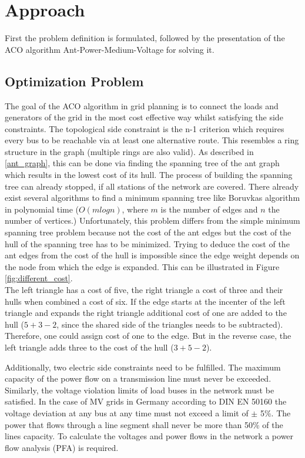 \chapter{Approach}\label{chap:approach}
First the problem definition is formulated, followed by the presentation of the ACO algorithm Ant-Power-Medium-Voltage for solving it.

\section{Optimization Problem}\label{optiproblem}
The goal of the ACO algorithm in grid planning is to connect the loads and generators of the grid in the most cost effective way whilst satisfying the side constraints. The topological side constraint is the n-1 criterion which requires every bus to be reachable via at least one alternative route. This resembles a ring structure in the graph (multiple rings are also valid). As described in \ref{ant_graph}, this can be done via finding the spanning tree of the ant graph which results in the lowest cost of its hull. The process of building the spanning tree can already stopped, if all stations of the network are covered. There already exist several algorithms to find a minimum spanning tree like Boruvkas algorithm in polynomial time ($O(mlogn)$, where $m$ is the number of edges and $n$ the number of vertices.) Unfortunately, this problem differs from the simple minimum spanning tree problem because not the cost of the ant edges but the cost of the hull of the spanning tree has to be minimized. Trying to deduce the cost of the ant edges from the cost of the hull is impossible since the edge weight depends on the node from which the edge is expanded. This can be illustrated in Figure \ref{fig:different_cost}.
 \\
The left triangle has a cost of five, the right triangle a cost of three and their hulls when combined a cost of six. If the edge starts at the incenter of the left triangle and expands the right triangle additional cost of one are added to the hull ($5+3-2$, since the shared side of the triangles needs to be subtracted). Therefore, one could assign cost of one to the edge. But in the reverse case, the left triangle adds three to the cost of the hull ($3+5-2$).

Additionally, two electric side constraints need to be fulfilled. The maximum capacity of the power flow on a transmission line must never be exceeded. Similarly, the voltage violation limits of load buses in the network must be satisfied. In the case of MV grids in Germany according to DIN EN 50160 the voltage deviation at any bus at any time must not exceed a limit of  $\pm$ 5\%. The power that flows through a line segment shall never be more than 50\% of the lines capacity. To calculate the voltages and power flows in the network a power flow analysis (PFA) is required.

